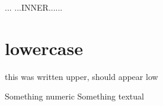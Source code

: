 \documentclass{article}
\begin{document}
\MakeTextUppercase{...\NoCaseChange{\begin{center}} ...inner...\NoCaseChange{\end{center}}...}

\section{\MakeTextLowercase{Lowercase}}

\MakeTextLowercase{THIS WAS WRITTEN UPPER, SHOULD APPEAR LOW}

\begin{thebibliography}{9}

 Something numeric
 Something textual
\end{thebibliography}
\end{document}

